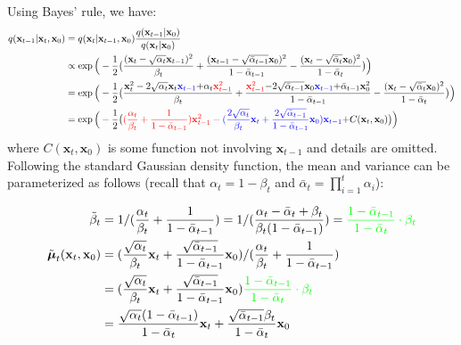 \documentclass[12pt]{article}
\begin{document}
Using Bayes' rule, we have:
\[
\begin{aligned}
q(\mathbf{x}_{t-1} \vert \mathbf{x}_t, \mathbf{x}_0) 
&= q(\mathbf{x}_t \vert \mathbf{x}_{t-1}, \mathbf{x}_0) \frac{ q(\mathbf{x}_{t-1} \vert \mathbf{x}_0) }{ q(\mathbf{x}_t \vert \mathbf{x}_0) } \\
&\propto \exp \Big(-\frac{1}{2} \big(\frac{(\mathbf{x}_t - \sqrt{\alpha_t} \mathbf{x}_{t-1})^2}{\beta_t} + \frac{(\mathbf{x}_{t-1} - \sqrt{\bar{\alpha}_{t-1}} \mathbf{x}_0)^2}{1-\bar{\alpha}_{t-1}} - \frac{(\mathbf{x}_t - \sqrt{\bar{\alpha}_t} \mathbf{x}_0)^2}{1-\bar{\alpha}_t} \big) \Big) \\
&= \exp \Big(-\frac{1}{2} \big(\frac{\mathbf{x}_t^2 - 2\sqrt{\alpha_t} \mathbf{x}_t \color{blue}{\mathbf{x}_{t-1}} \color{black}{+ \alpha_t} \color{red}{\mathbf{x}_{t-1}^2} }{\beta_t} + \frac{ \color{red}{\mathbf{x}_{t-1}^2} \color{black}{- 2 \sqrt{\bar{\alpha}_{t-1}} \mathbf{x}_0} \color{blue}{\mathbf{x}_{t-1}} \color{black}{+ \bar{\alpha}_{t-1} \mathbf{x}_0^2}  }{1-\bar{\alpha}_{t-1}} - \frac{(\mathbf{x}_t - \sqrt{\bar{\alpha}_t} \mathbf{x}_0)^2}{1-\bar{\alpha}_t} \big) \Big) \\
&= \exp\Big( -\frac{1}{2} \big( \color{red}{(\frac{\alpha_t}{\beta_t} + \frac{1}{1 - \bar{\alpha}_{t-1}})} \mathbf{x}_{t-1}^2 - \color{blue}{(\frac{2\sqrt{\alpha_t}}{\beta_t} \mathbf{x}_t + \frac{2\sqrt{\bar{\alpha}_{t-1}}}{1 - \bar{\alpha}_{t-1}} \mathbf{x}_0)} \mathbf{x}_{t-1} \color{black}{ + C(\mathbf{x}_t, \mathbf{x}_0) \big) \Big)}
\end{aligned}
\]
where $C(\mathbf{x}_t, \mathbf{x}_0)$ is some function not involving $\mathbf{x}_{t-1}$ and details are omitted. Following the standard Gaussian density function, the mean and variance can be parameterized as follows (recall that $\alpha_t = 1 - \beta_t$ and $\bar{\alpha}_t = \prod_{i=1}^t \alpha_i$):

\[
\begin{aligned}
\tilde{\beta}_t 
&= 1/(\frac{\alpha_t}{\beta_t} + \frac{1}{1 - \bar{\alpha}_{t-1}}) 
= 1/(\frac{\alpha_t - \bar{\alpha}_t + \beta_t}{\beta_t(1 - \bar{\alpha}_{t-1})})
= \color{green}{\frac{1 - \bar{\alpha}_{t-1}}{1 - \bar{\alpha}_t} \cdot \beta_t} \\
\tilde{\boldsymbol{\mu}}_t (\mathbf{x}_t, \mathbf{x}_0)
&= (\frac{\sqrt{\alpha_t}}{\beta_t} \mathbf{x}_t + \frac{\sqrt{\bar{\alpha}_{t-1} }}{1 - \bar{\alpha}_{t-1}} \mathbf{x}_0)/(\frac{\alpha_t}{\beta_t} + \frac{1}{1 - \bar{\alpha}_{t-1}}) \\
&= (\frac{\sqrt{\alpha_t}}{\beta_t} \mathbf{x}_t + \frac{\sqrt{\bar{\alpha}_{t-1} }}{1 - \bar{\alpha}_{t-1}} \mathbf{x}_0) \color{green}{\frac{1 - \bar{\alpha}_{t-1}}{1 - \bar{\alpha}_t} \cdot \beta_t} \\
&= \frac{\sqrt{\alpha_t}(1 - \bar{\alpha}_{t-1})}{1 - \bar{\alpha}_t} \mathbf{x}_t + \frac{\sqrt{\bar{\alpha}_{t-1}}\beta_t}{1 - \bar{\alpha}_t} \mathbf{x}_0\\
\end{aligned}
\]
\end{document}
